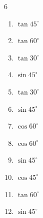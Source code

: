 \begin{multicols}{6}
\begin{enumerate}

  \item $\displaystyle \tan{45^\circ}$

        \phantom{$\displaystyle =1$}

  \item $\displaystyle \tan{60^\circ}$


\columnbreak %

  \item $\displaystyle \tan{30^\circ}$


  \item $\displaystyle \sin{45^\circ}$


  \item $\displaystyle \tan{30^\circ}$


  \item $\displaystyle \sin{45^\circ}$


  \item $\displaystyle \cos{60^\circ}$


  \item $\displaystyle \cos{60^\circ}$


  \item $\displaystyle \sin{45^\circ}$


  \item $\displaystyle \cos{45^\circ}$


  \item $\displaystyle \tan{60^\circ}$


  \item $\displaystyle \sin{45^\circ}$



\end{enumerate}
\end{multicols}
